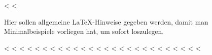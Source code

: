 \documentclass[runningheads,a4paper,ngerman]{llncs}[2022/01/12]
\begin{document}
<%
\newcount\LTGbeginlineexample
\newcount\LTGendlineexample
\newenvironment{ltgexample}%
{\LTGbeginlineexample=\numexpr\inputlineno+1\relax}%
{%
\LTGendlineexample=\numexpr\inputlineno-1\relax%

\tcbinputlisting{%
  listing only,
  listing file=\currfilepath,
  colback=green!5!white,
  colframe=green!25,
  coltitle=black!90,
  coltext=black!90,
  left=8mm,
  title=Zugehöriger \LaTeX{}-Quelltext aus \texttt{\currfilepath},
<%
  listing options={%
    frame=none,
    language={[LaTeX]TeX},
    escapeinside={},
    firstline=\the\LTGbeginlineexample,
    lastline=\the\LTGendlineexample,
    firstnumber=\the\LTGbeginlineexample,
    basewidth=.5em,
    aboveskip=0mm,
    belowskip=0mm,
    numbers=left,
    xleftmargin=0mm,
    numberstyle=\tiny,
    numbersep=8pt%
  }
<%
    minted language=TeX,
    minted style=vs,
    minted options={
      fontsize=\footnotesize,
      firstline=\the\LTGbeginlineexample,
      lastline=\the\LTGendlineexample,
      firstnumber=\the\LTGbeginlineexample,
      breaklines,
      linenos,
      numbersep=8pt
    }
<%
}
}%
<%

Hier sollen allgemeine \LaTeX-Hinweise gegeben werden, damit man Minimalbeispiele vorliegen hat, um sofort loszulegen.

<%
<%
<%
<%
<%
<%
<%
<%
<%
<%
<%
<%
<%
<%
<%
<%
<%
<%
<%
<%
<%
<%
<%
<%
<%
<%
\end{document}
